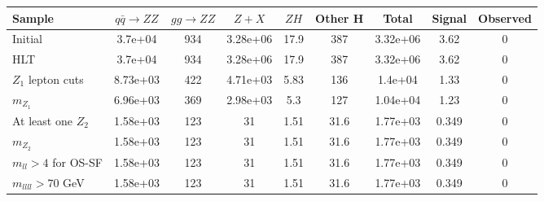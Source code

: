 \begin{table*}[htbH]    
\begin{center}    
\label{tab:yields}    
\begin{tabular}{ l | c | c | c | c | c | c | c | c }     
\hline    
\hline    
Sample & $q\bar{q} \rightarrow ZZ$ & $gg \rightarrow ZZ$ & $Z+X$ & $ZH$ & Other H & Total & Signal & Observed \\ 
\hline 
Initial & 3.7e+04 & 934 & 3.28e+06 & 17.9 & 387 & 3.32e+06 & 3.62 & 0 \\ 
\hline 
HLT & 3.7e+04 & 934 & 3.28e+06 & 17.9 & 387 & 3.32e+06 & 3.62 & 0 \\ 
\hline 
$Z_1$ lepton cuts & 8.73e+03 & 422 & 4.71e+03 & 5.83 & 136 & 1.4e+04 & 1.33 & 0 \\ 
\hline 
$m_{Z_1}$ & 6.96e+03 & 369 & 2.98e+03 & 5.3 & 127 & 1.04e+04 & 1.23 & 0 \\ 
\hline 
At least one $Z_2$ & 1.58e+03 & 123 & 31 & 1.51 & 31.6 & 1.77e+03 & 0.349 & 0 \\ 
\hline 
$m_{Z_2}$ & 1.58e+03 & 123 & 31 & 1.51 & 31.6 & 1.77e+03 & 0.349 & 0 \\ 
\hline 
$m_{ll}>4$ for OS-SF & 1.58e+03 & 123 & 31 & 1.51 & 31.6 & 1.77e+03 & 0.349 & 0 \\ 
\hline 
$m_{llll} > 70$ GeV & 1.58e+03 & 123 & 31 & 1.51 & 31.6 & 1.77e+03 & 0.349 & 0 \\ 
\hline 
\hline    
\end{tabular}    
\end{center}    
\end{table*} 


